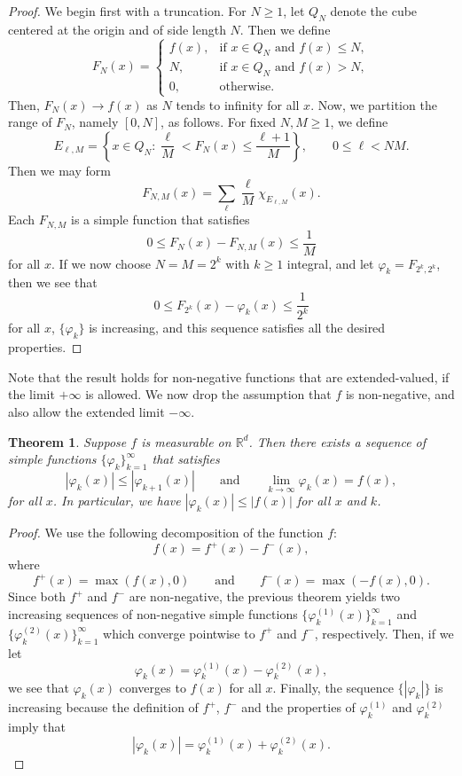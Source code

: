 \documentclass[11pt,openany]{book}
\newtheorem{theorem}{Theorem}[section]
\begin{document}
\begin{proof}
We begin first with a truncation. For $N\ge1$, let $Q_N$ denote the cube centered at the origin and of side length $N$. Then we define
\[
 F_N(x)=
 \begin{cases}
 f(x),&\text{if }x\in Q_N\text{ and }f(x)\le N,\\
 N,&\text{if }x\in Q_N\text{ and }f(x)>N,\\
 0,&\text{otherwise}.
 \end{cases}
\]
Then, $F_N(x)\to f(x)$ as $N$ tends to infinity for all $x$. Now, we partition the range of $F_N$, namely $[0,N]$, as follows. For fixed $N,M\ge1$, we define
\[
 E_{\ell,M}
 =\left\{x\in Q_N:\frac{\ell}{M}<F_N(x)\le\frac{\ell+1}{M}\right\},
 \qquad 0\le\ell<NM.
\]
Then we may form
\[
 F_{N,M}(x)=\sum_\ell\frac{\ell}{M}\chi_{E_{\ell,M}}(x).
\]
Each $F_{N,M}$ is a simple function that satisfies
\[
 0\le F_N(x)-F_{N,M}(x)\le\frac1M
\]
for all $x$. If we now choose $N=M=2^k$ with $k\ge1$ integral, and let $\varphi_k=F_{2^k,2^k}$, then we see that
\[
 0\le F_{2^k}(x)-\varphi_k(x)\le\frac1{2^k}
\]
for all $x$, $\{\varphi_k\}$ is increasing, and this sequence satisfies all the desired properties.
\end{proof}

Note that the result holds for non-negative functions that are extended-valued, if the limit $+\infty$ is allowed. We now drop the assumption that $f$ is non-negative, and also allow the extended limit $-\infty$.

\begin{theorem}
Suppose $f$ is measurable on $\mathbb{R}^d$. Then there exists a sequence of simple functions $\{\varphi_k\}_{k=1}^{\infty}$ that satisfies
\[
 |\varphi_k(x)|\le |\varphi_{k+1}(x)|
 \qquad\text{and}\qquad
 \lim_{k\to\infty}\varphi_k(x)=f(x),
\]
for all $x$. In particular, we have $|\varphi_k(x)|\le|f(x)|$ for all $x$ and $k$.
\end{theorem}

\begin{proof}
We use the following decomposition of the function $f$:
\[
 f(x)=f^+(x)-f^-(x),
\]
where
\[
 f^+(x)=\max(f(x),0)
 \qquad\text{and}\qquad
 f^-(x)=\max(-f(x),0).
\]
Since both $f^+$ and $f^-$ are non-negative, the previous theorem yields two increasing sequences of non-negative simple functions $\{\varphi_k^{(1)}(x)\}_{k=1}^{\infty}$ and $\{\varphi_k^{(2)}(x)\}_{k=1}^{\infty}$ which converge pointwise to $f^+$ and $f^-$, respectively. Then, if we let
\[
 \varphi_k(x)=\varphi_k^{(1)}(x)-\varphi_k^{(2)}(x),
\]
we see that $\varphi_k(x)$ converges to $f(x)$ for all $x$. Finally, the sequence $\{|\varphi_k|\}$ is increasing because the definition of $f^+$, $f^-$ and the properties of $\varphi_k^{(1)}$ and $\varphi_k^{(2)}$ imply that
\[
 |\varphi_k(x)|=\varphi_k^{(1)}(x)+\varphi_k^{(2)}(x).
\]
\end{proof}
\end{document}

